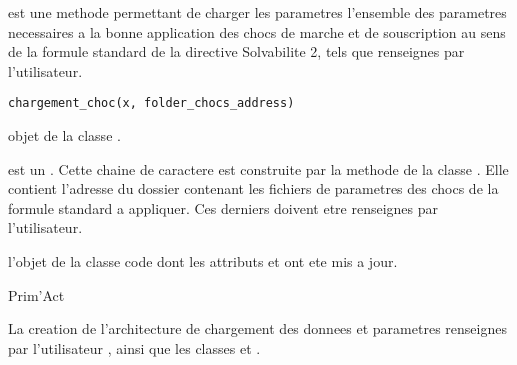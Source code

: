 \documentclass[a4paper]{book}
\begin{document}
%
\begin{Description}\relax
{} est une methode permettant de charger les parametres
l'ensemble des parametres necessaires a la bonne application des chocs de marche et
de souscription au sens de la formule standard de la directive Solvabilite 2,
tels que renseignes par l'utilisateur.
\end{Description}
%
\begin{Usage}
\begin{verbatim}
chargement_choc(x, folder_chocs_address)
\end{verbatim}
\end{Usage}
%
\begin{Arguments}
\begin{ldescription}
\item[\code{x}] objet de la classe .

\item[\code{folder\_choc\_address}] est un . Cette chaine de caractere est construite par la methode
 de la classe .
Elle contient l'adresse du dossier contenant les fichiers de parametres des chocs de la formule standard a appliquer.
Ces derniers doivent etre renseignes par l'utilisateur.
\end{ldescription}
\end{Arguments}
%
\begin{Value}
 l'objet  de la classe \bsl{}code dont les attributs 
et  ont ete mis a jour.
\end{Value}
%
\begin{Author}\relax
Prim'Act
\end{Author}
%
\begin{SeeAlso}\relax
La creation de l'architecture de chargement des donnees et parametres renseignes par l'utilisateur
,
ainsi que les classes  et .
\end{SeeAlso}
\end{document}
